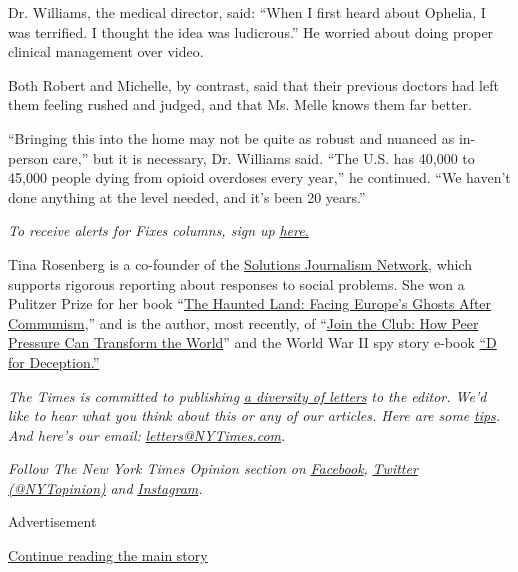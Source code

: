 Dr. Williams, the medical director, said: ``When I first heard about
Ophelia, I was terrified. I thought the idea was ludicrous.'' He worried
about doing proper clinical management over video.

Both Robert and Michelle, by contrast, said that their previous doctors
had left them feeling rushed and judged, and that Ms. Melle knows them
far better.

``Bringing this into the home may not be quite as robust and nuanced as
in-person care,'' but it is necessary, Dr. Williams said. ``The U.S. has
40,000 to 45,000 people dying from opioid overdoses every year,'' he
continued. ``We haven't done anything at the level needed, and it's been
20 years.''

\emph{To receive alerts for Fixes columns, sign up}
\href{http://eepurl.com/ABIxL}{\emph{here.}}

Tina Rosenberg is a co-founder of the
\href{http://solutionsjournalism.org}{Solutions Journalism Network},
which supports rigorous reporting about responses to social problems.
She won a Pulitzer Prize for her book
``\href{http://www.randomhouse.com/catalog/display.pperl?isbn=9780679744993}{The
Haunted Land: Facing Europe's Ghosts After Communism},'' and is the
author, most recently, of
``\href{http://books.wwnorton.com/books/Join-the-Club}{Join the Club:
How Peer Pressure Can Transform the World}'' and the World War II spy
story e-book
\href{https://www.goodreads.com/book/show/16124470-d-for-deception}{``D
for Deception.''}

\emph{The Times is committed to publishing}
\href{https://www.nytimes3xbfgragh.onion/2019/01/31/opinion/letters/letters-to-editor-new-york-times-women.html}{\emph{a
diversity of letters}} \emph{to the editor. We'd like to hear what you
think about this or any of our articles. Here are some}
\href{https://help.nytimes3xbfgragh.onion/hc/en-us/articles/115014925288-How-to-submit-a-letter-to-the-editor}{\emph{tips}}\emph{.
And here's our email:}
\href{mailto:letters@NYTimes.com}{\emph{letters@NYTimes.com}}\emph{.}

\emph{Follow The New York Times Opinion section on}
\href{https://www.facebookcorewwwi.onion/nytopinion}{\emph{Facebook}}\emph{,}
\href{http://twitter.com/NYTOpinion}{\emph{Twitter (@NYTopinion)}}
\emph{and}
\href{https://www.instagram.com/nytopinion/}{\emph{Instagram}}\emph{.}

Advertisement

\protect\hyperlink{after-bottom}{Continue reading the main story}

